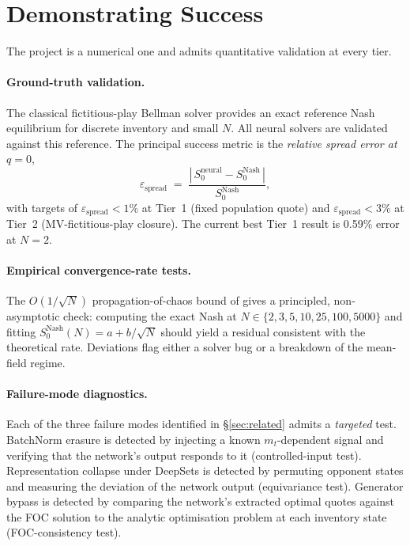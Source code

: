 \documentclass[11pt,a4paper]{article}
\begin{document}
\section{Demonstrating Success}\label{sec:success}

The project is a numerical one and admits quantitative validation at
every tier.

\paragraph{Ground-truth validation.}
The classical fictitious-play Bellman solver provides an exact
reference Nash equilibrium for discrete inventory and small $N$.
All neural solvers are validated against this reference.  The
principal success metric is the \emph{relative spread error at
$q=0$},
\begin{equation*}
  \varepsilon_{\text{spread}} \;=\; \frac{|\,S^{\text{neural}}_0 - S^{\text{Nash}}_0\,|}{S^{\text{Nash}}_0},
\end{equation*}
with targets of $\varepsilon_{\text{spread}} < 1\%$ at Tier~1 (fixed
population quote) and $\varepsilon_{\text{spread}} < 3\%$ at Tier~2
(MV-fictitious-play closure).  The current best Tier~1 result is
0.59\% error at $N = 2$.

\paragraph{Empirical convergence-rate tests.}
The $O(1/\sqrt{N})$ propagation-of-chaos bound of
\citet{buckdahn2009limit} gives a principled, non-asymptotic check:
computing the exact Nash at $N \in \{2, 3, 5, 10, 25, 100, 5000\}$ and
fitting $S^{\text{Nash}}_0(N) = a + b/\sqrt{N}$ should yield a
residual consistent with the theoretical rate.  Deviations flag
either a solver bug or a breakdown of the mean-field regime.

\paragraph{Failure-mode diagnostics.}
Each of the three failure modes identified in \S\ref{sec:related}
admits a \emph{targeted} test.  BatchNorm erasure is detected by
injecting a known $m_t$-dependent signal and verifying that the
network's output responds to it (controlled-input test).
Representation collapse under DeepSets is detected by permuting
opponent states and measuring the deviation of the network output
(equivariance test).  Generator bypass is detected by comparing the
network's extracted optimal quotes against the FOC solution to the
analytic optimisation problem at each inventory state
(FOC-consistency test).
\end{document}
